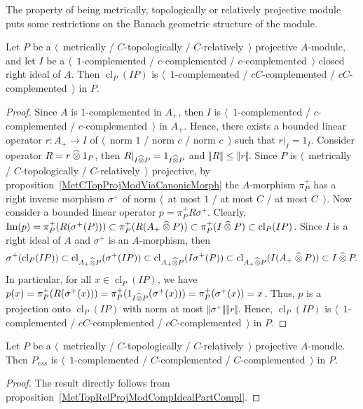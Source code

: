 The property of being metrically, topologically or relatively projective module 
puts some restrictions on the Banach geometric structure of the module.

\begin{proposition}\label{MetTopRelProjModCompIdealPartCompl} Let $P$ 
be a $\langle$~metrically / $C$-topologically / $C$-relatively~$\rangle$ 
projective $A$-module, and let $I$ 
be a $\langle$~$1$-complemented / $c$-complemented / $c$-complemented~$\rangle$
closed right ideal of $A$. Then $\operatorname{cl}_P(I P)$ 
is $\langle$~$1$-complemented / $cC$-complemented / $cC$-complemented~$\rangle$ 
in $P$.
\end{proposition}
\begin{proof} Since $A$ is $1$-complemented in $A_+$, then $I$ 
is $\langle$~$1$-complemented / $c$-complemented / $c$-complemented~$\rangle$
in $A_+$. Hence, there exists a bounded linear operator $r:A_+\to I$ of 
$\langle$~norm $1$ / norm $c$ / norm $c$~$\rangle$ such that $r|_I=1_I$. 
Consider operator $R=r\mathbin{\widehat{\otimes}} 1_P$, then $R|_{I\mathbin{\widehat{\otimes}} P}=1_{I\mathbin{\widehat{\otimes}} P}$ 
and $\Vert R\Vert\leq\Vert r\Vert$. Since $P$ 
is $\langle$~metrically / $C$-topologically / $C$-relatively~$\rangle$ 
projective, by proposition~\ref{MetCTopProjModViaCanonicMorph} the 
$A$-morphism $\pi_P^+$ has a right inverse morphism $\sigma^+$ of norm
$\langle$~at most $1$ / at most $C$ / at most $C$~$\rangle$. Now consider a 
bounded linear operator $p=\pi_P^+ R \sigma^+$. Clearly,
$\operatorname{Im}(p)=\pi_P^+(R(\sigma^+(P)))
\subset\pi_P^+(R(A_+\mathbin{\widehat{\otimes}} P))
\subset \pi_P^+(I\mathbin{\widehat{\otimes}} P)
\subset \operatorname{cl}_P(I P)$.
Since $I$ is a right ideal of $A$ and $\sigma^+$ is an $A$-morphism, then 
$$
\sigma^+(\operatorname{cl}_P(I P))
\subset \operatorname{cl}_{A_+\mathbin{\widehat{\otimes}} P}(\sigma^+(I P))
\subset \operatorname{cl}_{A_+\mathbin{\widehat{\otimes}} P}(I\sigma^+(P))
\subset \operatorname{cl}_{A_+\mathbin{\widehat{\otimes}} P}(I (A_+\mathbin{\widehat{\otimes}} P))
\subset I \mathbin{\widehat{\otimes}} P.
$$
In particular, for all $x\in \operatorname{cl}_P(I P)$, we have 
$p(x)
=\pi_P^+(R(\sigma^+(x)))
=\pi_P^+(1_{I\mathbin{\widehat{\otimes}} P}(\sigma^+(x)))
=\pi_P^+(\sigma^+(x))
=x$. 
Thus, $p$ is a projection onto $\operatorname{cl}_P(I P)$ with norm at 
most $\Vert \sigma^+\Vert\Vert r\Vert$. Hence, $\operatorname{cl}_P(I P)$ 
is $\langle$~$1$-complemented / $cC$-complemented / 
$cC$-complemented~$\rangle$ in $P$.
\end{proof}

\begin{corollary}\label{MetTopRelProjModPartCompl} Let $P$ 
be a $\langle$~metrically / $C$-topologically / $C$-relatively~$\rangle$ 
projective $A$-moudle. Then $P_{ess}$ 
is $\langle$~$1$-complemented / $C$-complemented / $C$-complemented~$\rangle$ 
in $P$.
\end{corollary}
\begin{proof} The result directly follows from 
proposition~\ref{MetTopRelProjModCompIdealPartCompl}.
\end{proof}

